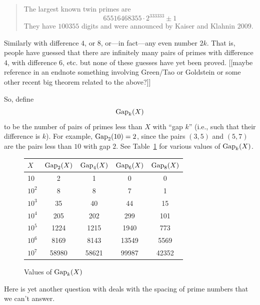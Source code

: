 \documentclass[11pt]{article}
\theoremstyle{plain}
\theoremstyle{definition}
\numberwithin{equation}{section}
\numberwithin{figure}{section}
\numberwithin{table}{section}
\begin{document}
\begin{quote} The largest known twin primes are 
$$65516468355\cdot 2^{333333} \pm 1$$
They have $100355$ digits and were announced by Kaiser and Klahnin
$2009$.
\end{quote}


Similarly with difference $4$, or $8$, or---in fact---any even number
$2k$. That is, people have guessed that there are infinitely many
pairs of primes with difference $4$, with difference $6$, etc. but
none of these guesses have yet been proved. [[maybe reference in an
endnote something involving Green/Tao or Goldstein or some other
recent big theorem related to the above?]]




   
So, define $${\rm Gap}_{k}(X)$$ to be the number of pairs of primes
less than $X$ with ``gap $k$'' (i.e., such that their difference is
$k$).  For example, ${\rm Gap}_2(10) = 2$, since the pairs $(3,5)$ and
$(5,7)$ are the pairs less than $10$ with gap $2$.
See Table~\ref{tab:gap} for various values of ${\rm Gap}_{k}(X)$.
   
   \bigskip
   
\begin{figure}[H]
\begin{center}
\caption{Values of ${\rm Gap}_{k}(X)$ \label{tab:gap}}
\vspace{1em}

\begin{tabular}{|l|c|c|c|c|}\hline
$X$ & ${\rm Gap}_{2}(X)$ & ${\rm Gap}_{4}(X)$& ${\rm Gap}_{6}(X)$ & ${\rm Gap}_{8}(X)$\\\hline
10 & 2 & 1 & 0 & 0\\\hline
$10^2$ & 8 & 8 & 7 & 1 \\\hline
$10^3$ & 35 & 40 & 44 & 15 \\\hline
$10^4$ & 205 & 202 & 299 & 101 \\\hline
$10^5$ & 1224 & 1215 & 1940 & 773 \\\hline
$10^6$ & 8169 & 8143 & 13549 & 5569 \\\hline
$10^7$ & 58980 & 58621 & 99987 & 42352 \\\hline
\end{tabular}
\end{center}
\end{figure}   

   \bigskip
   
   Here is yet another question with deals with
the spacing of prime numbers that we can't answer.
  
\end{document}
